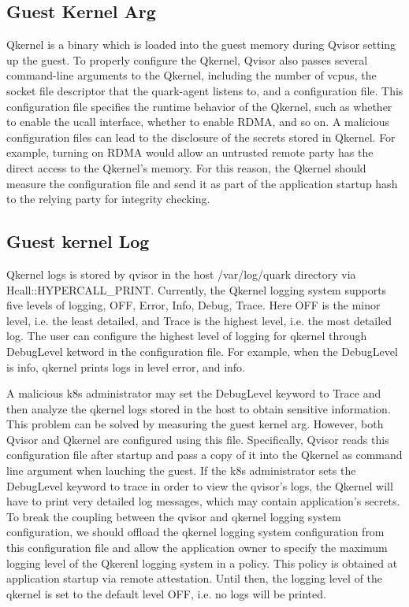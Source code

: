 \subsection{Guest Kernel Arg}
Qkernel is a binary which is loaded into the guest memory during Qvisor setting up the guest. To properly configure the Qkernel,  Qvisor also passes several command-line arguments to the Qkernel, including the number of vcpus, the socket file 
descriptor that the quark-agent listens to, and a configuration file. This configuration file specifies the runtime behavior of the Qkernel, such as whether to enable the ucall interface, whether to enable RDMA, and so on. A malicious configuration 
files can lead to the disclosure of the secrets stored in Qkernel. For example, turning on RDMA would allow an untrusted remote party has the direct access to the Qkernel’s memory. For this reason, the Qkernel should measure the configuration file 
and send it as part of the application startup hash to the relying party for integrity checking. 

\subsection{Guest kernel Log}
Qkernel logs is stored by qvisor in the host /var/log/quark directory via Hcall::HYPERCALL\_PRINT. Currently, the Qkernel logging system supports five levels of logging, OFF, Error, Info, Debug, Trace. Here OFF is the minor level, i.e. the least 
detailed, and Trace is the highest level, i.e. the most detailed log. The user can configure the highest level of logging for qkernel through DebugLevel ketword in the configuration file. For example, when the DebugLevel is info, qkernel 
prints logs in level error, and info. 

A malicious k8s administrator may set the DebugLevel keyword to Trace and then analyze the qkernel logs stored in the host to obtain sensitive information. 
This problem can be solved by measuring the guest kernel arg. However, both Qvisor and Qkernel are configured using this file. Specifically, Qvisor reads this configuration file after startup and pass a copy of it into the Qkernel as command 
line argument when lauching the guest. If the k8s administrator sets the DebugLevel keyword to trace in order to view the qvisor's logs, the Qkernel will have to print very detailed log messages, which may contain application’s secrets. 
To break the coupling between the qvisor and qkernel logging system configuration, we should offload the qkernel logging system configuration from this configuration file and allow the application owner to specify the maximum logging level of the 
Qkerenl logging system in a policy. This policy is obtained at application startup via remote attestation. Until then, the logging level of the qkernel is set to the default level OFF, i.e. no logs will be printed.


\cleardoublepage

